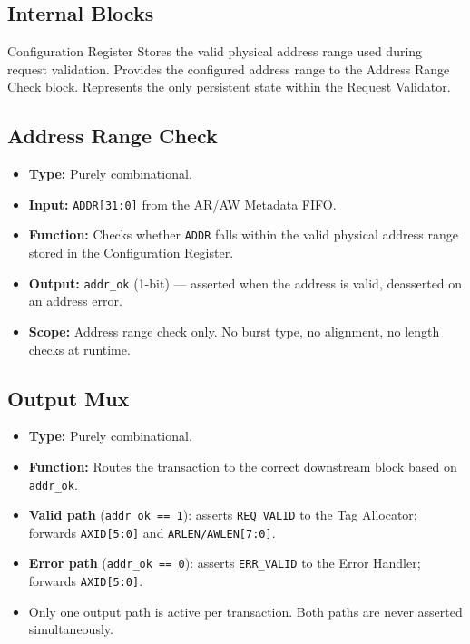 \subsection{Internal Blocks}

Configuration Register
Stores the valid physical address range used during request validation.
Provides the configured address range to the Address Range Check block.
Represents the only persistent state within the Request Validator.

\subsection{Address Range Check}

\begin{itemize}
  \item \textbf{Type:} Purely combinational.
  \item \textbf{Input:} \texttt{ADDR[31:0]} from the AR/AW Metadata
        FIFO.
  \item \textbf{Function:} Checks whether \texttt{ADDR} falls within
        the valid physical address range stored in the Configuration Register.
  \item \textbf{Output:} \texttt{addr\_ok} (1-bit) — asserted when the
        address is valid, deasserted on an address error.
  \item \textbf{Scope:} Address range check only. No burst type, no
        alignment, no length checks at runtime.
\end{itemize}

\subsection{Output Mux}

\begin{itemize}
  \item \textbf{Type:} Purely combinational.
  \item \textbf{Function:} Routes the transaction to the correct
        downstream block based on \texttt{addr\_ok}.
  \item \textbf{Valid path} (\texttt{addr\_ok == 1}): asserts
        \texttt{REQ\_VALID} to the Tag Allocator; forwards
        \texttt{AXID[5:0]} and \texttt{ARLEN/AWLEN[7:0]}.
  \item \textbf{Error path} (\texttt{addr\_ok == 0}): asserts
        \texttt{ERR\_VALID} to the Error Handler; forwards
        \texttt{AXID[5:0]}.
  \item Only one output path is active per transaction. Both paths are
        never asserted simultaneously.
\end{itemize}

